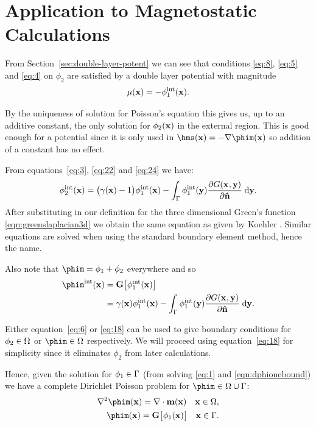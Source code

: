 \section{Application to Magnetostatic Calculations}
From Section~\ref{sec:double-layer-potent} we can see that conditions \eqref{eq:8}, \eqref{eq:5} and \eqref{eq:4} on $\phi_2$ are satisfied by a double layer potential with magnitude
\begin{equation}
  \label{eq:24}
  \mu(\mathbf{x}) = - \phi^{\text{int}}_1(\mathbf{x}).
\end{equation}

By the uniqueness of solution for Poisson's equation this gives us, up to an additive constant, the only solution for $\phi_2(\mathbf{x})$ in the external region.
This is good enough for a potential since it is only used in $\hms(\xv) = - \nabla \phim(\xv)$ so addition of a constant has no effect.

From equations~\eqref{eq:3}, \eqref{eq:22} and \eqref{eq:24} we have:
\begin{equation}
  \label{eq:6}
  \phi^{\text{int}}_2(\mathbf{x}) =  \big(\gamma(\mathbf{x}) - 1 \big) \phi^{\text{int}}_1(\mathbf{x})
  - \int_{{\Gamma}} \phi^{\text{int}}_1(\mathbf{y}) \frac{\partial G(\mathbf{x}_{},\mathbf{y})}{\partial \mathbf{\hat{n}}} {\; \text{d}} \mathbf{y}.
\end{equation}
After substituting in our definition for the three dimensional Green's function \eqref{eqn:greenslaplacian3d} we obtain the same equation as given by Koehler \cite{Koehler1997}.
Similar equations are solved when using the standard boundary element method, hence the name.

Also note that $\phim = \phi_1 + \phi_2$ everywhere and so
\begin{align}
  \label{eq:18}
  \phim^\inte(\xv) &= \bm \big[ \phi^\inte_1(\xv) \big] \\
  &= \gamma(\xv) \phi^\inte_1(\xv)
  - \int_{\boundd} \phi^\inte_1(\yv) \pd{\Green}{\nv} \d \yv. \notag
\end{align}

Either equation~\eqref{eq:6} or \eqref{eq:18} can be used to give boundary conditions for $\phi_2 \in \Omega$ or $\phim \in \magd$ respectively. We will proceed using equation~\eqref{eq:18} for simplicity since it eliminates $\phi_2$ from later calculations.

 Hence, given the solution for $\phi_1 \in {\Gamma}$ (from solving \eqref{eq:1} and \eqref{eqn:dphionebound}) we have a complete Dirichlet Poisson problem for $\phim \in \magd \cup \boundd$:
\begin{align}
  \label{eq:phim-bem}
  \lap \phim(\xv) = \nabla \cdot \mv(\xv) \quad \xv \in \magd, \\
  \phim(\xv) = \bm \big[ \phi_1(\xv) \big] \quad \xv \in \boundd.
\end{align}

